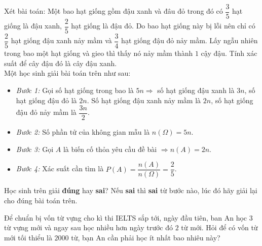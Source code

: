 \begin{bt}%
	Xét bài toán: Một bao hạt giống gồm đậu xanh và đâu đỏ trong đó có $\dfrac{3}{5}$ hạt giống là đậu xanh, $\dfrac{2}{5}$ hạt giống là đậu đỏ. Do bao hạt giống này bị lỗi nên chỉ có $\dfrac{2}{5}$ hạt giống đậu xanh nảy mầm và $\dfrac{3}{4}$ hạt giống đậu đỏ nảy mầm. Lấy ngẫu nhiên trong bao một hạt giống và gieo thì thấy nó nảy mầm thành $1$ cậy đậu. Tính xác suất để cây đậu đó là cây đậu xanh.\\
	Một học sinh giải bài toán trên như sau:
	\begin{itemize}
		\item \textit{Bước 1:} Gọi số hạt giống trong bao là $5n \Rightarrow $ số hạt giống đậu xanh là $3n$, số hạt giống đậu đỏ là $2n$. Số hạt giống đậu xanh nảy mầm là $2n$, số hạt giống đậu đỏ nảy mầm là $\dfrac{3n}{2}$.
		\item \textit{Bước 2:} Số phần tử của không gian mẫu là $n(\Omega)=5n$.
		\item \textit{Bước 3:} Gọi $A$ là biến cố thỏa yêu cầu đề bài $\Rightarrow n(A)=2n$.
		\item \textit{Bước 4:} Xác suất cần tìm là $P(A)=\dfrac{n(A)}{n(\Omega)}=\dfrac{2}{5}$.
	\end{itemize}
Học sinh trên giải \textbf{đúng} hay \textbf{sai}? Nếu \textbf{sai} thì \textbf{sai} từ bước nào, lúc đó hãy giải lại cho đúng bài toán trên.
\end{bt}

\begin{bt}%
	Để chuẩn bị vốn từ vựng cho kì thi IELTS sắp tới, ngày đầu tiên, ban An học $3$ từ vựng mới và ngay sau học nhiều hơn ngày trước đó $2$ từ mới. Hỏi để có vốn từ mới tối thiểu là $2000$ từ, bạn An cần phải học ít nhất bao nhiêu này?
\end{bt}

